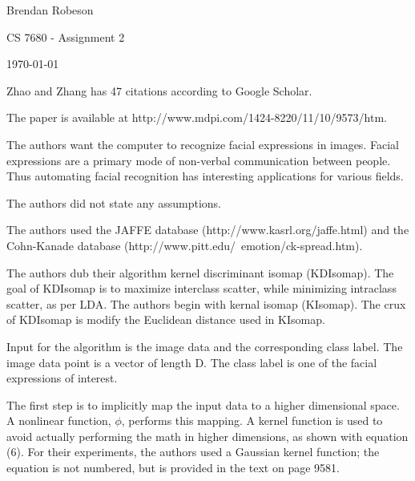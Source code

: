 \documentclass[11pt]{article}
\begin{document}
\noindent Brendan Robeson

\noindent CS 7680 - Assignment 2

\noindent \today

\medskip

\begin{description}[leftmargin=0in]
    \item [Source] Zhao and Zhang \cite{s111009573} has 47 citations according
        to Google Scholar.

    \item [URL] The paper is available at
        http://www.mdpi.com/1424-8220/11/10/9573/htm.

    \item [Problem] The authors want the computer to recognize facial
        expressions in images. Facial expressions are a primary mode of
        non-verbal communication between people. Thus automating facial
        recognition has interesting applications for various fields.

    \item [Assumptions] The authors did not state any assumptions.

    \item [Data Sets] The authors used the JAFFE database
        (http://www.kasrl.org/jaffe.html) and the Cohn-Kanade database
        (http://www.pitt.edu/~emotion/ck-spread.htm).

    \item [Algorithm Overview] The authors dub their algorithm kernel
        discriminant isomap (KDIsomap). The goal of KDIsomap is to maximize
        interclass scatter, while minimizing intraclass scatter, as per LDA. The
        authors begin with kernal isomap (KIsomap). The crux of KDIsomap is
        modify the Euclidean distance used in KIsomap.

        Input for the algorithm is the image data and the corresponding class
        label. The image data point is a vector of length D. The class label is
        one of the facial expressions of interest.

        The first step is to implicitly map the input data to a higher dimensional
        space. A nonlinear function, \(\phi\), performs this mapping. A kernel
        function is used to avoid actually performing the math in higher
        dimensions, as shown with equation (6). For their experiments, the
        authors used a Gaussian kernel function; the equation is not numbered,
        but is provided in the text on page 9581.


\end{description}
\end{document}
